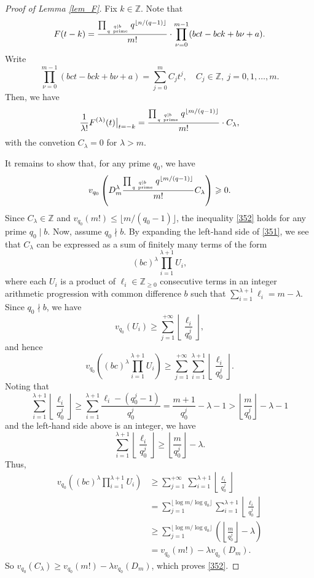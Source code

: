 \documentclass[12pt]{article}
\numberwithin{equation}{section}
\begin{document}
\begin{proof}[Proof of Lemma \ref{lem_F}]
Fix $k \in \mathbb{Z}$. Note that 
\[ F(t-k) =  \frac{\prod_{q \mid b \atop q ~\text{prime}} q^{\lfloor n/(q-1) \rfloor}}{m!} \cdot \prod_{\nu=0}^{m-1} (bct -bck +b\nu + a). \]
Write
\begin{equation}\label{351}
		\prod_{\nu=0}^{m-1} (bct-bck+b\nu + a) =  \sum_{j=0}^{m} C_jt^{j}, \quad C_j \in \mathbb{Z},~ j=0,1,\ldots,m.
\end{equation} 
Then, we have
\[ \frac{1}{\lambda!}  F^{(\lambda)}(t)  \big|_{t=-k} = \frac{\prod_{q \mid b \atop q ~\text{prime}} q^{\lfloor m/(q-1) \rfloor}}{m!} \cdot C_{\lambda}, \]
with the convetion $C_{\lambda} = 0$ for $\lambda > m$.
	
It remains to show that, for any prime $q_0$, we have
\begin{equation}\label{352}
v_{q_0} \left( D_m^{\lambda}  \frac{\prod_{q \mid b \atop q ~\text{prime}} q^{\lfloor m/(q-1) \rfloor}}{m!} C_{\lambda}\right)  \geqslant 0. 
\end{equation}
Since $C_\lambda \in \mathbb{Z}$ and $v_{q_0}(m!) \leqslant \lfloor  m/(q_0-1)\rfloor$, the inequality \eqref{352} holds for any prime $q_0 \mid b$. Now, assume $q_0 \nmid b$. By expanding the left-hand side of \eqref{351}, we see that $C_\lambda$ can be expressed as a sum of finitely many terms of the form
\[ {(bc)}^{\lambda} \prod_{i=1}^{\lambda+1} U_i, \]
where each $U_i$ is a product of $\ell_i \in \mathbb{Z}_{\geqslant 0}$ consecutive terms in an integer arithmetic progression with common difference $b$ such that $\sum_{i=1}^{\lambda+1} \ell_i = m-\lambda$. Since $q_0 \nmid b$, we have
\[ v_{q_0}(U_i) \geqslant \sum_{j=1}^{+\infty} \left\lfloor  \frac{\ell_i}{q_0^{j}}\right\rfloor, \]
and hence
\[ v_{q_0} \left( {(bc)}^{\lambda} \prod_{i=1}^{\lambda+1} U_i \right) \geqslant \sum_{j=1}^{+\infty} \sum_{i=1}^{\lambda+1} \left\lfloor  \frac{\ell_i}{q_0^{j}}\right\rfloor.  \]
Noting that
\[ \sum_{i=1}^{\lambda+1} \left\lfloor  \frac{\ell_i}{q_0^{j}}\right\rfloor \geqslant \sum_{i=1}^{\lambda+1} \frac{\ell_i - (q_0^{j}-1)}{q_0^{j}} = \frac{m+1}{q_0^{j}} - \lambda - 1 > \left\lfloor \frac{m}{q_0^{j}} \right\rfloor - \lambda - 1  \]
and the left-hand side above is an integer, we have
\[ \sum_{i=1}^{\lambda+1} \left\lfloor  \frac{\ell_i}{q_0^{j}}\right\rfloor \geqslant \left\lfloor \frac{m}{q_0^{j}} \right\rfloor - \lambda. \]
Thus, 
\begin{align*}
v_{q_0} \left( {(bc)}^{\lambda} \prod_{i=1}^{\lambda+1} U_i \right) &\geqslant \sum_{j=1}^{+\infty} \sum_{i=1}^{\lambda+1} \left\lfloor  \frac{\ell_i}{q_0^{j}}\right\rfloor \\
&= \sum_{j=1}^{\lfloor \log m / \log q_0 \rfloor} \sum_{i=1}^{\lambda+1} \left\lfloor  \frac{\ell_i}{q_0^{j}}\right\rfloor \\
&\geqslant \sum_{j=1}^{\lfloor \log m / \log q_0 \rfloor} \left( \left\lfloor \frac{m}{q_0^{j}} \right\rfloor - \lambda \right) \\
&= v_{q_0}(m!) - \lambda v_{q_0}(D_m).
\end{align*}
So $v_{q_0}(C_{\lambda}) \geqslant v_{q_0}(m!) - \lambda v_{q_0}(D_m)$, which proves \eqref{352}.
\end{proof}
\end{document}
